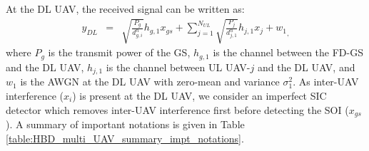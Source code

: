 
At the DL UAV, the received signal can be written as:
\begin{eqnarray}
y_{DL} & = & \sqrt{\frac{P_g}{d_{g,i}^{n}}}h_{g,1}x_{gs} + \sum_{j=1}^{N_{UL}} \sqrt{\frac{P_j}{d_{j,1}^{n}}}h_{j,1}x_{j} + {w_{1}}_,
\end{eqnarray} 
where $P_g$ is the transmit power of the GS, $h_{g,1}$ is the channel between the FD-GS and the DL UAV, $h_{j,1}$ is the channel between UL UAV-$j$ and the DL UAV, and $w_{1}$ is the AWGN at the DL UAV with zero-mean and variance $\sigma_1^2$. As inter-UAV interference ($x_i$) is present at the DL UAV, we consider an imperfect SIC detector which removes inter-UAV interference first before detecting the SOI ($x_{gs}$). A summary of important notations is given in Table \ref{table:HBD_multi_UAV_summary_impt_notations}.

\begin{table}[]
\centering
\caption{Summary of Important Notations}
\label{table:HBD_multi_UAV_summary_impt_notations} 
\end{table}


